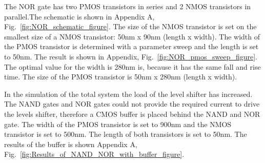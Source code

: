 The NOR gate has two PMOS transistors in series and 2 NMOS transistors in parallel.The schematic is shown in Appendix A, Fig.~\ref{fig:NOR_schematic_figure}. The size of the NMOS transistor is set on the smallest size of a NMOS transistor: 50nm x 90nm (length x width). The width of the PMOS transistor is determined with a parameter sweep and the length is set to 50nm. The result is shown in Appendix, Fig.~\ref{fig:NOR_pmos_sweep_figure}. The optimal value for the width is 280nm is, because it has the same fall and rise time. The size of the PMOS transistor is 50nm x 280nm (length x width).

In the simulation of the total system the load of the level shifter has increased. The NAND gates and NOR gates could not provide the required current to drive the levels shifter, therefore a CMOS buffer is placed behind the NAND and NOR gate. The width of the PMOS transistor is set to 900nm and the NMOS transistor is set to 500nm. The length of both transistors is set to 50nm. The results of the buffer is shown Appendix A,  Fig.~\ref{fig:Results_of_NAND_NOR_with_buffer_figure}.

